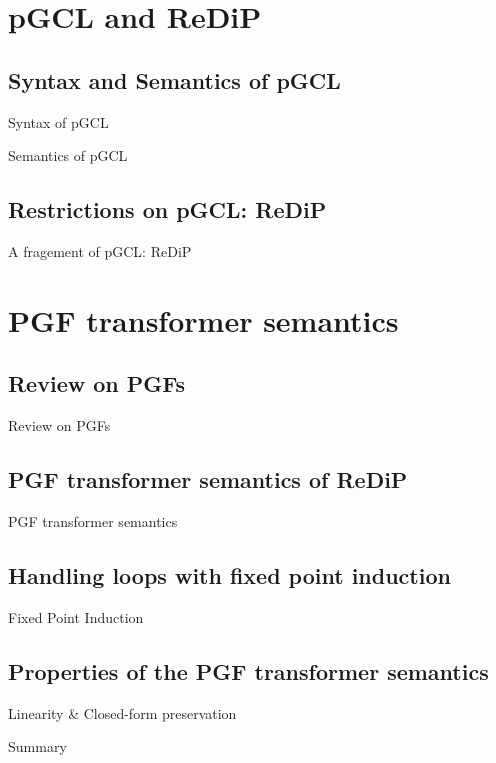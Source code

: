 \documentclass[11pt]{beamer}
\begin{document}
\section{pGCL and ReDiP}
\subsection{Syntax and Semantics of pGCL}
\begin{frame}{Syntax of pGCL}

\end{frame}
\begin{frame}{Semantics of pGCL}

\end{frame}
\subsection{Restrictions on pGCL: ReDiP}
\begin{frame}{A fragement of pGCL: ReDiP}

\end{frame}

\section{PGF transformer semantics}
\subsection{Review on PGFs}
\begin{frame}{Review on PGFs}

\end{frame}
\subsection{PGF transformer semantics of ReDiP}
\begin{frame}{PGF transformer semantics}

\end{frame}
\subsection{Handling loops with fixed point induction}
\begin{frame}{Fixed Point Induction}

\end{frame}
\subsection{Properties of the PGF transformer semantics}
\begin{frame}{Linearity \& Closed-form preservation}

\end{frame}
\begin{frame}{Summary}

\end{frame}
\end{document}
